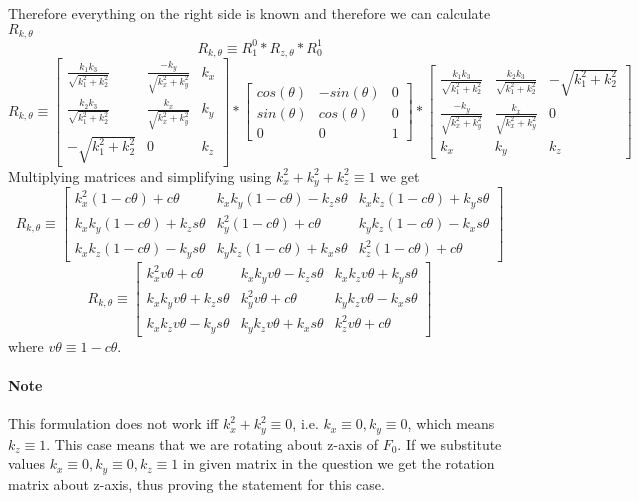 \documentclass[12pt]{article}
\newcommand{\rz}[1]{\begin{bmatrix} cos(#1) & -sin(#1) & 0 \\ sin(#1) & cos(#1) & 0 \\ 0 & 0 & 1 \end{bmatrix}}
\begin{document}
Therefore everything on the right side is known and therefore we can calculate $ R_{k,\theta} $
\[
  R_{k,\theta} \equiv R_1^0 * R_{z,\theta} * R_0^1
\]
\[
  R_{k,\theta} \equiv
  \begin{bmatrix}
  \frac{k_1k_3}{\sqrt{k_1^2 + k_2^2}} & \frac{-k_y}{\sqrt{k_x^2 + k_y^2}}  & k_x \\
  \frac{k_2k_3}{\sqrt{k_1^2 + k_2^2}} & \frac{k_x}{\sqrt{k_x^2 + k_y^2}}   & k_y \\
  -\sqrt{k_1^2 + k_2^2}               & 0 & k_z
  \end{bmatrix}
  *
  \rz{\theta}
  *
  \begin{bmatrix}
  \frac{k_1k_3}{\sqrt{k_1^2 + k_2^2}} & \frac{k_2k_3}{\sqrt{k_1^2 + k_2^2}} & -\sqrt{k_1^2 + k_2^2} \\
  \frac{-k_y}{\sqrt{k_x^2 + k_y^2}}  & \frac{k_x}{\sqrt{k_x^2 + k_y^2}}   & 0 \\
  k_x & k_y & k_z
  \end{bmatrix}
\]
Multiplying matrices and simplifying using $ k_x^2 + k_y^2 + k_z^2 \equiv 1 $ we get
\[
  R_{k,\theta} \equiv
  \begin{bmatrix}
    k_x^2(1 - c\theta) + c\theta & k_xk_y(1 - c\theta) - k_zs\theta & k_xk_z(1 - c\theta) + k_ys\theta\\
    k_xk_y(1 - c\theta) + k_zs\theta & k_y^2(1 - c\theta) + c\theta & k_yk_z(1 - c\theta) - k_xs\theta \\
    k_xk_z(1 - c\theta) - k_ys\theta & k_yk_z(1 - c\theta) + k_xs\theta & k_z^2(1 - c\theta) + c\theta
  \end{bmatrix}
\]
\[
  R_{k,\theta} \equiv
  \begin{bmatrix}
    k_x^2v\theta + c\theta & k_xk_yv\theta - k_zs\theta & k_xk_zv\theta + k_ys\theta\\
    k_xk_yv\theta + k_zs\theta & k_y^2v\theta + c\theta & k_yk_zv\theta - k_xs\theta \\
    k_xk_zv\theta - k_ys\theta & k_yk_zv\theta + k_xs\theta & k_z^2v\theta + c\theta
  \end{bmatrix}
\]
where $v\theta \equiv 1 - c\theta$.
\paragraph{Note} This formulation does not work iff $ k_x^2 + k_y^2 \equiv 0 $, i.e. $ k_x \equiv 0, k_y \equiv 0 $, which means $ k_z \equiv 1 $.
This case means that we are rotating about z-axis of $ F_0 $.
If we substitute values $ k_x \equiv 0, k_y \equiv 0, k_z \equiv 1 $ in given matrix in the question we get the rotation matrix about z-axis, thus proving the statement for this case.
\end{document}

